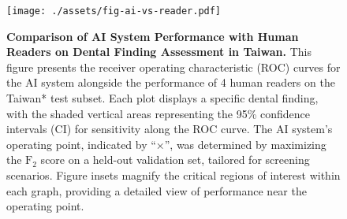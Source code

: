 \begin{figure}[!t]
    \centering
    \texttt{[image: ./assets/fig-ai-vs-reader.pdf]}
    \caption{
        \textbf{Comparison of AI System Performance with Human Readers on Dental Finding Assessment in Taiwan.}
        This figure presents the receiver operating characteristic (ROC) curves for the AI system alongside the performance of 4 human readers on the Taiwan* test subset.
        Each plot displays a specific dental finding, with the shaded vertical areas representing the 95\% confidence intervals (CI) for sensitivity along the ROC curve.
        The AI system’s operating point, indicated by ``×'', was determined by maximizing the $\textrm{F}_2$ score on a held-out validation set, tailored for screening scenarios.
        Figure insets magnify the critical regions of interest within each graph, providing a detailed view of performance near the operating point.
    }
    \label{fig:ai-vs-reader}
\end{figure}